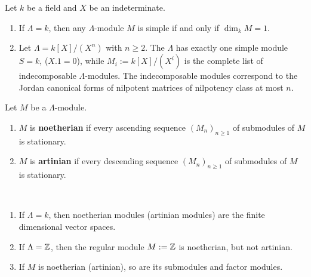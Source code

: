 \begin{example}
Let $k$ be a field and $X$ be an indeterminate.
\begin{enumerate}
\item If $\Lambda= k$, then any $\Lambda$-module $M$ is simple if and only if $\dim_k M = 1$.
\item Let $\Lambda=k[X]/(X^n)$ with $n\ge 2$.  The $\Lambda$ has exactly one simple module $S=k$, ($X.1=0$), while $M_i:=k[X]/(X^i)$ is the complete list of indecomposable $\Lambda$-modules. The indecomposable modules correspond to the Jordan canonical forms of nilpotent matrices of nilpotency class at most $n$.   
\end{enumerate} 
\end{example}


\begin{definition}
Let $M$ be a $\Lambda$-module.
\begin{enumerate}
\item $M$ is \textbf{noetherian} if every ascending sequence $(M_n)_{n\ge 1}$ of submodules of $M$ is stationary.
\item $M$ is \textbf{artinian} if every descending sequence $(M_n)_{n\ge 1}$ of submodules of $M$ is stationary.
\end{enumerate}
\end{definition}


\begin{example}\
\begin{enumerate}
\item If $\Lambda=k$, then noetherian modules (artinian modules) are the finite dimensional vector spaces.
\item If $\Lambda=\mathbb{Z}$, then the regular module $M:=\mathbb{Z}$ is noetherian, but not artinian.
\item If $M$ is noetherian (artinian), so are its submodules and factor modules.
\end{enumerate}
\end{example}


